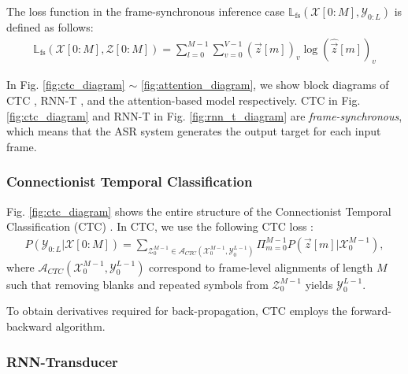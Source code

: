 \documentclass{article}
\begin{document}
The loss function in the frame-synchronous inference case
$\mathbb{L}_{\text{fs}}\left(\mathcal{X}[0:M], \mathcal{Y}_{0:L}\right)$ is 
defined as follows:
\begin{align}
  \mathbb{L}_{\text{fs}}\left(\mathcal{X}[0:M], \mathcal{Z}[0:M]\right) 
      = \sum_{l=0}^{M-1} 
          \sum_{v=0}^{V-1}  
            (\vec{z}[m])_v  
            \log (\widehat{\vec{z}}[m])_v  
        \label{eq:frame_synchronous_ce_loss} 
\end{align}


 In Fig. 
\ref{fig:ctc_diagram} $\sim$ \ref{fig:attention_diagram}, we show
block diagrams of CTC \cite{a_graves_icml_2006_00}, 
RNN-T \cite{a_graves_corr_2012_00, a_graves_icassp_2013_00}, and 
the attention-based model 
\cite{
j_chorowski_nips_2015_00,
w_chan_icassp_2016_00} respectively. CTC in Fig. \ref{fig:ctc_diagram} 
and RNN-T in Fig. \ref{fig:rnn_t_diagram} are {\it frame-synchronous}, 
which means that the ASR system generates the output target for each 
input frame.


\subsubsection{Connectionist Temporal Classification}
\label{sec:ctc}

Fig. \ref{fig:ctc_diagram} shows the entire structure of the 
Connectionist Temporal Classification (CTC) 
\cite{a_graves_icml_2006_00}. In CTC, we use the following CTC loss
\cite{a_graves_icml_2006_00, y_he_icassp_2019_00}:
\begin{align}
  P\left(\mathcal{Y}_{0:L} | \mathcal{X}[0:M]\right) = 
    \sum_{\mathcal{Z}_{0}^{M-1} \in 
      \mathcal{A}_{CTC} 
        \left(\mathcal{X}_{0}^{M-1}, \mathcal{Y}_{0}^{L-1} \right)}
          \Pi_{m=0}^{M-1}
            P\left(\vec{z}[m] | \mathcal{X}_{0}^{M-1} \right),
\end{align}
where $\mathcal{A}_{CTC} \left(\mathcal{X}_{0}^{M-1}, 
\mathcal{Y}_{0}^{L-1} \right)$ correspond to frame-level alignments
of length $M$ such that removing blanks and repeated symbols from 
$\mathcal{Z}_{0}^{M-1}$ yields $\mathcal{Y}_{0}^{L-1}$.

To obtain derivatives required for back-propagation, CTC employs 
the forward-backward algorithm.



\subsubsection{RNN-Transducer}
\label{sec:rnn_t}
\end{document}
